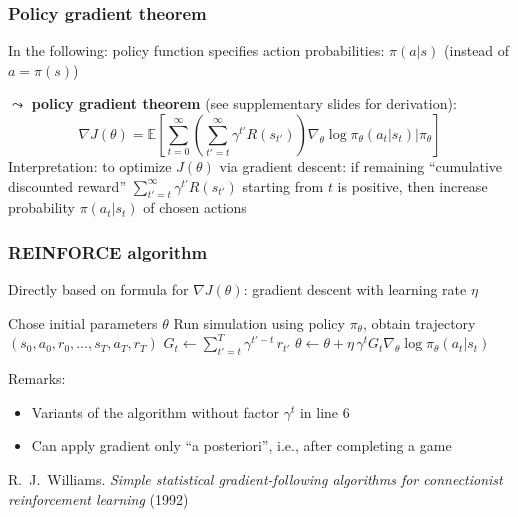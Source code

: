 \documentclass[t]{beamer}
\begin{document}
\begin{frame}
\frametitle{Policy gradient theorem}
In the following: policy function specifies action probabilities: $\pi(a \vert s)$ (instead of $a = \pi(s)$)

$\leadsto$ \textbf{policy gradient theorem} (see supplementary slides for derivation):
\[
\nabla J(\theta) = \mathbb{E}\!\left[ \sum_{t=0}^{\infty} \left(\sum_{t'=t}^{\infty} \gamma^{t'} R(s_{t'})\right) \nabla_{\theta} \log \pi_{\theta}(a_t \vert s_t) \big\vert \pi_{\theta} \right]
\]
Interpretation: to optimize $J(\theta)$ via gradient descent: if remaining ``cumulative discounted reward'' $\sum_{t'=t}^{\infty} \gamma^{t'} R(s_{t'})$ starting from $t$ is positive, then increase probability $\pi(a_t \vert s_t)$ of chosen actions
\end{frame}



\begin{frame}
\frametitle{REINFORCE algorithm}
Directly based on formula for $\nabla J(\theta)$: gradient descent with learning rate $\eta$

\begin{algorithmic}[1]
\State Chose initial parameters $\theta$
    \State Run simulation using policy $\pi_{\theta}$, obtain trajectory $(s_0, a_0, r_0, \dots, s_T, a_T, r_T)$
        \State $G_t \gets \sum_{t'=t}^T \gamma^{t'-t} \, r_{t'}$
        \State $\theta \gets \theta + \eta \, \gamma^t G_t \nabla_{\theta} \log \pi_{\theta}(a_t \vert s_t)$ 
    \EndFor
\EndFor
\end{algorithmic}

Remarks:\\
\begin{itemize}
\item Variants of the algorithm without factor $\gamma^t$ in line $6$
\item Can apply gradient only ``a posteriori'', i.e., after completing a game
\end{itemize}

\vfill

{\small
R.~J.~Williams. \emph{Simple statistical gradient-following algorithms for connectionist reinforcement learning} (1992) \nocite{Williams1992}
}
\end{frame}
\end{document}
